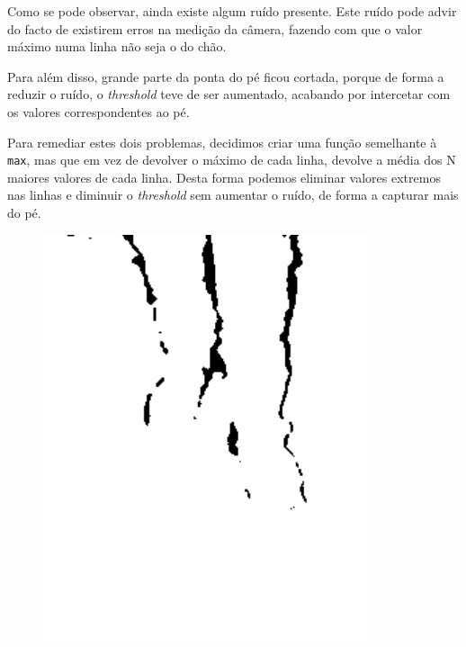 \documentclass[a4paper]{report}
\begin{document}
Como se pode observar, ainda existe algum ruído presente. Este ruído pode advir do
facto de existirem erros na medição da câmera, fazendo com que o valor máximo numa
linha não seja o do chão.

Para além disso, grande parte da ponta do pé ficou cortada, porque de forma a reduzir
o ruído, o \textit{threshold} teve de ser aumentado, acabando por intercetar com os valores correspondentes ao pé.

Para remediar estes dois problemas, decidimos criar uma função semelhante à \texttt{max}, mas
que em vez de devolver o máximo de cada linha, devolve a média dos N maiores valores de cada
linha. Desta forma podemos eliminar valores extremos nas linhas e diminuir o \textit{threshold}
sem aumentar o ruído, de forma a capturar mais do pé.

\begin{figure}[H]
\centering
\begin{minipage}{.5\textwidth}
  \centering
    \includegraphics[width=0.85\textwidth]{images/building/special_max_legs.png}
\end{minipage}%
\begin{minipage}{.5\textwidth}
  \centering

\end{minipage}
\end{figure}
\end{document}
